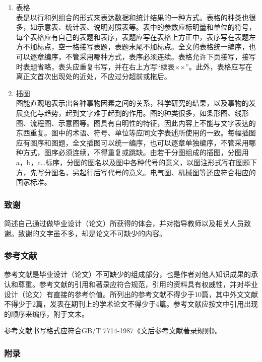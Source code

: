 \documentclass{HDU-Bachelor-Thesis}
\begin{document}
\begin{enumerate}
    \item 表格\\
    表是以行和列组合的形式来表达数据和统计结果的一种方式。表格的种类也很多，如示意表、统计表、说明对照表等。表中的参数应标明量和单位的符号，每个表格应有自己的表题和表序，表题应写在表格上方正中，表序写在表题左方不加标点，空一格接写表题，表题末尾不加标点。全文的表格统一编序，也可以逐章编序，不管采用哪种方式，表序必须连续。表格允许下页接写，接写时表题省略，表头应重复书写，并在右上方写“续表××”。此外，表格应写在离正文首次出现处的近处，不应过分超前或拖后。

    \item 插图\\
    图能直观地表示出各种事物因素之间的关系，科学研究的结果，以及事物的发展变化与趋势，起到文字难于起到的作用。图的种类很多，如条形图、线形图、流程图、示意图等。图具有自明性的特征，因此内容上不能与文字表达的东西重复。图中的术语、符号、单位等应同文字表述所使用的一致。每幅插图应有图序和图题，全文插图可以统一编序，也可以逐章单独编序，不管采用哪种方式，图序必须连续，不得重复或跳缺。由若干分图组成的插图，分图用a，b，c…标序，分图的图名以及图中各种代号的意义，以图注形式写在图题下方，先写分图名，另起行后写代号的意义。电气图、机械图等还应符合相应的国家标准。

\end{enumerate}

\subsubsection{致谢}

简述自己通过做毕业设计（论文）所获得的体会，并对指导教师以及相关人员致谢。致谢的文字虽不多，却是论文不可缺少的内容。

\subsubsection{参考文献}

参考文献是毕业设计（论文）不可缺少的组成部分，也是作者对他人知识成果的承认和尊重。参考文献的引用和著录应符合规范，引用的资料具有权威性，并对毕业设计（论文）有直接的参考价值。所列出的参考文献不得少于10篇，其中外文文献不得少于2篇，发表在期刊上的学术论文不得少于4篇。参考文献应按文中引用出现的顺序来编序，附于文未。

参考文献书写格式应符合GB/T 7714-1987《文后参考文献著录规则》\cite{gbt7714-1987}。

\subsubsection{附录}
\end{document}
